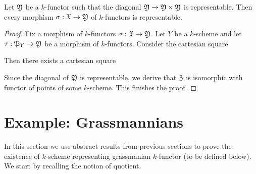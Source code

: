 \begin{proposition}\label{proposition:diagonal_representability_of_morphisms}
Let ${\mathfrak Y}$ be a $k$-functor such that the diagonal ${\mathfrak Y}\rightarrow {\mathfrak Y}\times {\mathfrak Y}$ is representable. Then every morphism $\sigma:{\mathfrak X}\rightarrow {\mathfrak Y}$ of $k$-functors is representable.
\end{proposition}
\begin{proof}
Fix a morphism of $k$-functors $\sigma:{\mathfrak X}\rightarrow {\mathfrak Y}$. Let $Y$ be a $k$-scheme and let $\tau:{\mathfrak P}_Y\rightarrow {\mathfrak Y}$ be a morphism of $k$-functors. Consider the cartesian square
\begin{center}
\end{center}
Then there exists a cartesian square
\begin{center}
\end{center}
Since the diagonal of ${\mathfrak Y}$ is representable, we derive that ${\mathfrak Z}$ is isomorphic with functor of points of some $k$-scheme. This finishes the proof.
\end{proof}

\section{Example: Grassmannians}
\noindent
In this section we use abstract results from previous sections to prove the existence of $k$-scheme representing grassmanian $k$-functor (to be defined below). We start by recalling the notion of quotient.

